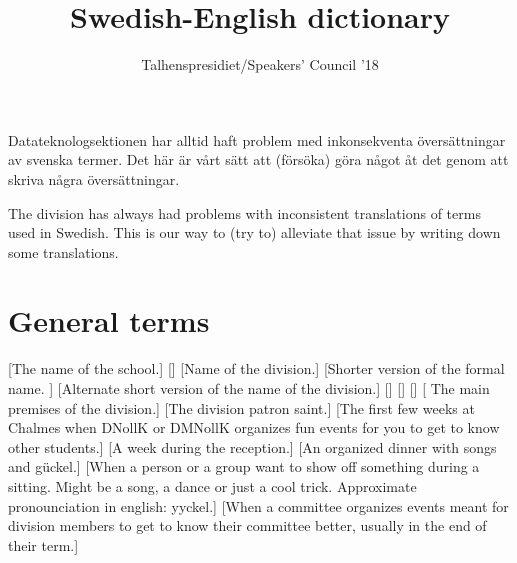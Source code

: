 \documentclass[a4paper]{article}
\title{Swedish-English dictionary}
\author{Talhenspresidiet/Speakers' Council '18}
\begin{document}
\begin{titlingpage}
    \maketitle
        Datateknologsektionen har alltid haft problem med inkonsekventa översättningar
        av svenska termer. Det här är vårt sätt att (försöka) göra något åt det genom
        att skriva några översättningar.

        The division has always had problems with inconsistent translations
        of terms used in Swedish. This is our way to (try to) alleviate that issue
        by writing down some translations.
\end{titlingpage}


\newpage
\tableofcontents

\newpage
{}
\setcounter{page}{2}

\section{General terms}
\begin{description}
    [\formal The name of the school.]
    []
    [\formal Name of the division.]
    [Shorter version of the formal name. ]
    [Alternate short version of the name of the division.]
    []
    []
    []
    [ The main premises of the division.]
    [The division patron saint.]
    [The first few weeks at Chalmes when DNollK or DMNollK organizes fun events for you to get to know other students.]
    [A week during the reception.]
    [An organized dinner with songs and gückel.]
    [When a person or a group want to show off something during a sitting. Might be a song, a dance or just a cool trick. Approximate pronounciation in english: yyckel.]
    [When a committee organizes events meant for division members to get to know their committee better, usually in the end of their term.]
\end{description}
\end{document}

